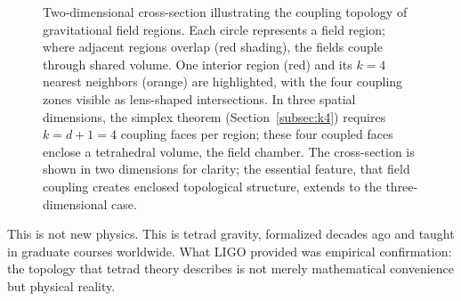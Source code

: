\documentclass[aps,prd,preprint,superscriptaddress,showpacs,preprintnumbers,amsmath,amssymb,nofootinbib]{revtex4-2}
\begin{document}
\begin{figure}[H]
\centering
{}
\caption{Two-dimensional cross-section illustrating the coupling topology of gravitational field regions. Each circle represents a field region; where adjacent regions overlap (red shading), the fields couple through shared volume. One interior region (red) and its $k = 4$ nearest neighbors (orange) are highlighted, with the four coupling zones visible as lens-shaped intersections. In three spatial dimensions, the simplex theorem (Section~\ref{subsec:k4}) requires $k = d + 1 = 4$ coupling faces per region; these four coupled faces enclose a tetrahedral volume, the field chamber. The cross-section is shown in two dimensions for clarity; the essential feature, that field coupling creates enclosed topological structure, extends to the three-dimensional case.}
\label{fig:packing}
\end{figure}

This is not new physics. This is tetrad gravity, formalized decades ago and taught in graduate courses worldwide. What LIGO provided was empirical confirmation: the topology that tetrad theory describes is not merely mathematical convenience but physical reality.
\end{document}
